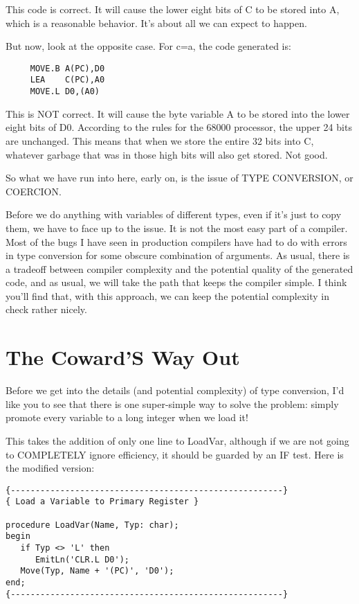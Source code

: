 This code is correct. It will cause the lower eight bits of C to be stored into A, which is a reasonable behavior. It's about all we can expect to happen.

But now, look at the opposite case. For c=a, the  code generated is:

\begin{verbatim}
     MOVE.B A(PC),D0
     LEA    C(PC),A0
     MOVE.L D0,(A0)
\end{verbatim}

This is  NOT  correct. It will cause the byte variable A to be stored into the lower eight bits  of  D0. According to the rules for the 68000 processor, the  upper 24 bits are unchanged. This means  that when we store the entire 32  bits  into  C, whatever garbage  that  was  in those high bits will also get stored. Not good.

So what  we  have  run  into here, early on, is the issue of  TYPE CONVERSION, or COERCION.

Before we do anything with  variables of different types, even if it's just to  copy  them, we have to face up to the issue. It is not the most easy part of a compiler. Most of  the  bugs  I have seen in production compilers  have  had to do with errors in type conversion for  some obscure combination of arguments. As usual, there is a tradeoff between compiler complexity and the potential quality of the  generated  code, and  as usual, we will take the path that keeps the  compiler  simple. I think you'll find that, with this approach, we can keep the potential complexity in check rather nicely.

\section{The Coward'S Way Out}

Before we get into the details (and potential complexity) of type conversion, I'd  like  you to see that there is one super-simple way to solve the problem: simply promote every variable to a long integer when we load it!

This takes the addition of only one line to LoadVar, although if we  are  not  going to COMPLETELY ignore efficiency, it should be guarded by an IF test. Here is the modified version:

\begin{verbatim}
{-------------------------------------------------------}
{ Load a Variable to Primary Register }

procedure LoadVar(Name, Typ: char);
begin
   if Typ <> 'L' then
      EmitLn('CLR.L D0');
   Move(Typ, Name + '(PC)', 'D0');
end;
{-------------------------------------------------------}
\end{verbatim}

